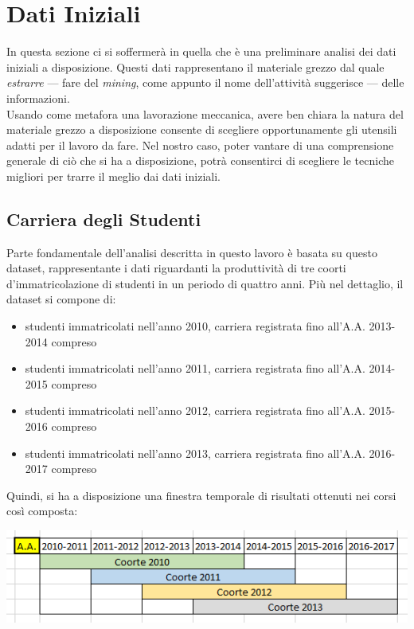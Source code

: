 \chapter{Dati Iniziali}

In questa sezione ci si soffermerà in quella che è una preliminare analisi dei dati iniziali a disposizione. Questi dati rappresentano il materiale grezzo dal quale \textit{estrarre} --- fare del \textit{mining}, come appunto il nome dell'attività suggerisce --- delle informazioni. \\

Usando come metafora una lavorazione meccanica, avere ben chiara la natura del materiale grezzo a disposizione consente di scegliere opportunamente gli utensili adatti per il lavoro da fare. Nel nostro caso, poter vantare di una comprensione generale di ciò che si ha a disposizione, potrà consentirci di scegliere le tecniche migliori per trarre il meglio dai dati iniziali. \\

\section{Carriera degli Studenti}

Parte fondamentale dell'analisi descritta in questo lavoro è basata su questo dataset, rappresentante i dati riguardanti la produttività di tre coorti d'immatricolazione di studenti in un periodo di quattro anni. Più nel dettaglio, il dataset si compone di:

\begin{itemize}
	\item studenti immatricolati nell'anno 2010, carriera registrata fino all'A.A. 2013-2014 compreso
	\item studenti immatricolati nell'anno 2011, carriera registrata fino all'A.A. 2014-2015 compreso
	\item studenti immatricolati nell'anno 2012, carriera registrata fino all'A.A. 2015-2016 compreso
	\item studenti immatricolati nell'anno 2013, carriera registrata fino all'A.A. 2016-2017 compreso
\end{itemize}

Quindi, si ha a disposizione una finestra temporale di risultati ottenuti nei corsi così composta:

\begin{center}
	\includegraphics[scale=0.7]{../raw/stud_comp.png}
\end{center}

